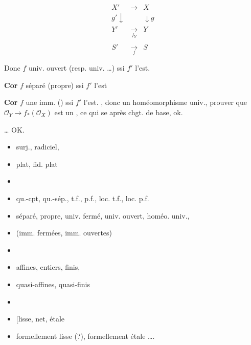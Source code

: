 \documentclass[11pt,a4paper]{article}
\begin{document}
\[
\begin{array}{ccc}
X' & \longrightarrow & X \\
{\scriptstyle g'}\downarrow & & \downarrow{\scriptstyle g} \\
Y' & \xrightarrow[\ f_Y\ ]{} & Y \\
& & \\
S' & \xrightarrow[\ f\ ]{} & S
\end{array}
\]

Donc $f$ univ. ouvert (resp. univ. \ill{} …) ssi $f'$ l'est.

\textbf{Cor} $f$ séparé (propre) ssi $f'$ l'est

\textbf{Cor} $f$ une imm. () ssi $f'$ l'est.  , donc un homéomorphisme univ.,  prouver que $\mathcal{O}_Y \to f_*(\mathcal{O}_X)$ est un , ce qui se  après chgt. de base, ok.

\struck{\ill{}} \quad {} \ill{} \ill{} \ldots{} OK.

\begin{itemize}
  \item surj., radiciel, \struck{\ill{}}
  \item plat, fid. plat
  \item \struck{\ill{}}
  \item qu.-cpt, qu.-sép.,  t.f., p.f., loc. t.f., loc. p.f.
  \item séparé, propre, \struck{\ill{}} univ. fermé, univ. ouvert, homéo. univ., \ill{}
  \item {} (imm. fermées, imm. ouvertes)
  \item \struck{\ill{}}
  \item affines, entiers, finis,
  \item quasi-affines, quasi-finis
  \item {}
  \item {}[lisse, net, étale
  \item formellement lisse (?), formellement étale ….
\end{itemize}


\end{document}
